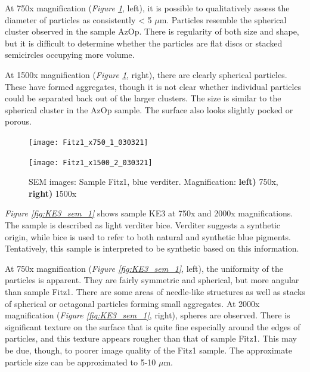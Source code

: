 At 750x magnification (\textit{Figure \ref{fig:Fitz1_sem_1}}, left), it is possible to qualitatively assess the diameter of particles as consistently < 5 $\mu$m. Particles resemble the spherical cluster observed in the sample AzOp. There is regularity of both size and shape, but it is difficult to determine whether the particles are flat discs or stacked semicircles occupying more volume.

At 1500x magnification (\textit{Figure \ref{fig:Fitz1_sem_1}}, right), there are clearly spherical particles. These have formed aggregates, though it is not clear whether individual particles could be separated back out of the larger clusters. The size is similar to the spherical cluster in the AzOp sample. The surface also looks slightly pocked or porous. 

\begin{figure}[H]
\centering
\begin{minipage}{.45\textwidth}
  \centering
  \texttt{[image: Fitz1\_x750\_1\_030321]}
\end{minipage}
\begin{minipage}{.45\textwidth}
  \centering
  \texttt{[image: Fitz1\_x1500\_2\_030321]}
\end{minipage}
\caption[SEM images: Sample Fitz1, blue verditer]{SEM images: Sample Fitz1, blue verditer. Magnification: \textbf{left)} 750x, \textbf{right)} 1500x}
\label{fig:Fitz1_sem_1}
\end{figure}



\textit{Figure \ref{fig:KE3_sem_1}} shows sample KE3 at 750x and 2000x magnifications. The sample is described as light verditer bice. Verditer suggests a synthetic origin, while bice is used to refer to both natural and synthetic blue pigments. Tentatively, this sample is interpreted to be synthetic based on this information.

At 750x magnification (\textit{Figure \ref{fig:KE3_sem_1}}, left), the uniformity of the particles is apparent. They are fairly symmetric and spherical, but more angular than sample Fitz1. There are some areas of needle-like structures as well as stacks of spherical or octagonal particles forming small aggregates. At 2000x magnification (\textit{Figure \ref{fig:KE3_sem_1}}, right), spheres are observed. There is significant texture on the surface that is quite fine especially around the edges of particles, and this texture appears rougher than that of sample Fitz1. This may be due, though, to poorer image quality of the Fitz1 sample. The approximate particle size can be approximated to 5-10 $\mu$m.

